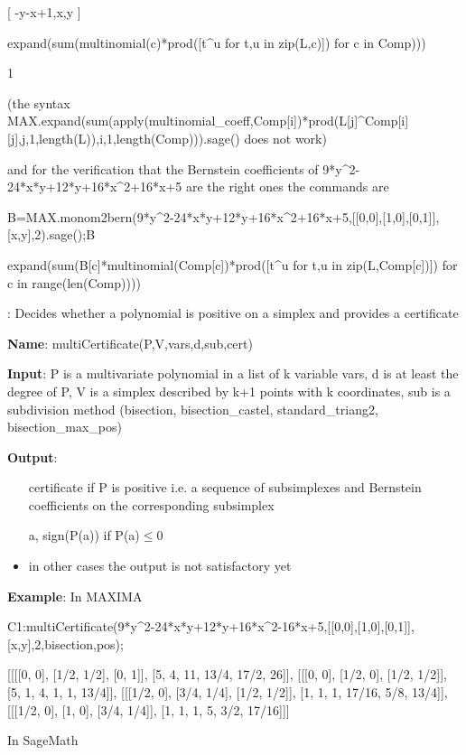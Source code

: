 \documentclass{article}
\begin{document}
  [ -y-x+1,x,y ]
 
 expand(sum(multinomial(c)*prod([t\^{}u for t,u in zip(L,c)])
for c in Comp)))

1

\noindent (the syntax MAX.expand(sum(apply(multinomial\_coeff,Comp[i])*prod(L[j]\^{}Comp[i][j],j,1,length(L)),i,1,length(Comp))).sage() does not work)

\noindent and for the verification that the Bernstein coefficients of 9*y\^{}2-24*x*y+12*y+16*x\^{}2+16*x+5 are the right ones the commands are 

B=MAX.monom2bern(9*y\^{}2-24*x*y+12*y+16*x\^{}2+16*x+5,[[0,0],[1,0],[0,1]],[x,y],2).sage();B

expand(sum(B[c]*multinomial(Comp[c])*prod([t\^{}u for t,u in zip(L,Comp[c])])
for c in range(len(Comp))))



:
  Decides whether a polynomial is positive on a simplex and provides a
  certificate
  
{\bf Name}: multiCertificate(P,V,vars,d,sub,cert)
  
 {\bf  Input}: P is a multivariate polynomial in a list of k variable vars, d is at
  least the degree of P, V is a simplex described by k+1 points with k
  coordinates, sub is a subdivision method (bisection, bisection\_castel,
  standard\_triang2, bisection\_max\_pos)
  
{\bf Output}:
  \begin{itemize}
    \item [certificate] if P is positive i.e. a sequence of subsimplexes and
    Bernstein coefficients on the corresponding subsimplex
    \item [a, sign(P(a))] if P(a)$\leqslant$0
    \item in other cases the output is not satisfactory yet
  \end{itemize}
  
  {\bf Example}: In MAXIMA
  
  
 C1:multiCertificate(9*y\^{}2-24*x*y+12*y+16*x\^{}2-16*x+5,[[0,0],[1,0],[0,1]],[x,y],2,bisection,pos);
 
[[[[0, 0], [1/2, 1/2], [0, 1]], [5, 4, 11, 13/4, 17/2, 26]],
 [[[0, 0], [1/2, 0], [1/2, 1/2]], [5, 1, 4, 1, 1, 13/4]],
 [[[1/2, 0], [3/4, 1/4], [1/2, 1/2]], [1, 1, 1, 17/16, 5/8, 13/4]],
 [[[1/2, 0], [1, 0], [3/4, 1/4]], [1, 1, 1, 5, 3/2, 17/16]]]
 
\noindent In SageMath 
\end{document}
